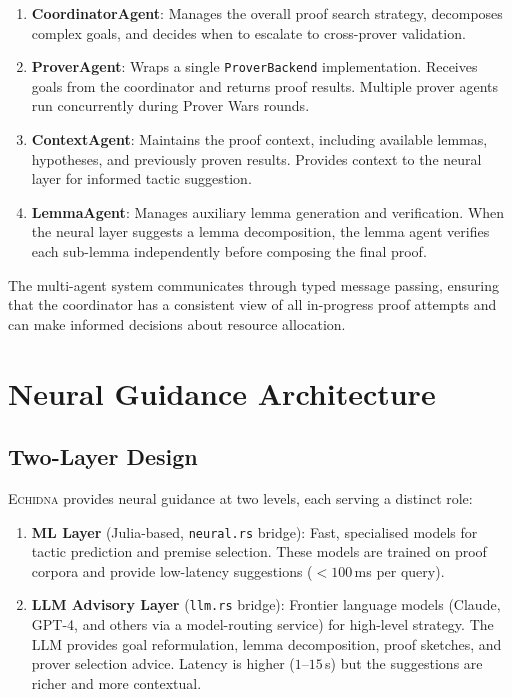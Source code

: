 \documentclass[11pt,a4paper]{article}
\newcommand{\echidna}{\textsc{Echidna}}
\newcommand{\proverbackend}{\texttt{ProverBackend}}
\begin{document}
\begin{enumerate}
  \item \textbf{CoordinatorAgent}: Manages the overall proof search strategy,
  decomposes complex goals, and decides when to escalate to cross-prover
  validation.

  \item \textbf{ProverAgent}: Wraps a single \proverbackend{} implementation.
  Receives goals from the coordinator and returns proof results. Multiple
  prover agents run concurrently during Prover Wars rounds.

  \item \textbf{ContextAgent}: Maintains the proof context, including
  available lemmas, hypotheses, and previously proven results. Provides
  context to the neural layer for informed tactic suggestion.

  \item \textbf{LemmaAgent}: Manages auxiliary lemma generation and
  verification. When the neural layer suggests a lemma decomposition,
  the lemma agent verifies each sub-lemma independently before
  composing the final proof.
\end{enumerate}

The multi-agent system communicates through typed message passing, ensuring
that the coordinator has a consistent view of all in-progress proof attempts
and can make informed decisions about resource allocation.


\section{Neural Guidance Architecture}
\label{sec:neural-architecture}

\subsection{Two-Layer Design}

\echidna{} provides neural guidance at two levels, each serving a distinct role:

\begin{enumerate}
  \item \textbf{ML Layer} (Julia-based, \texttt{neural.rs} bridge): Fast,
  specialised models for tactic prediction and premise selection. These models
  are trained on proof corpora and provide low-latency suggestions
  ($<100$\,ms per query).

  \item \textbf{LLM Advisory Layer} (\texttt{llm.rs} bridge): Frontier
  language models (Claude, GPT-4, and others via a model-routing service)
  for high-level strategy. The LLM provides goal reformulation, lemma
  decomposition, proof sketches, and prover selection advice. Latency is
  higher ($1$--$15$\,s) but the suggestions are richer and more contextual.
\end{enumerate}
\end{document}
